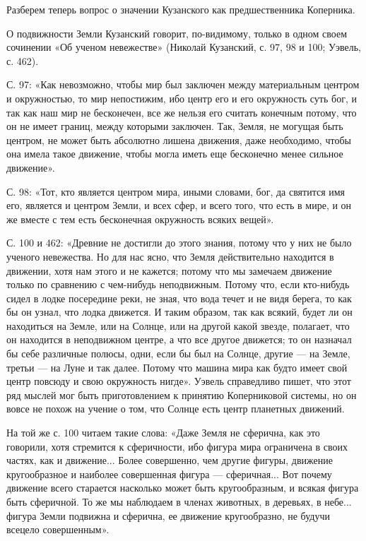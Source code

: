 Разберем  теперь  вопрос  о значении  Кузанского  как  предшественника
Коперника.

О  подвижности Земли  Кузанский говорит,  по-видимому, только  в одном
своем сочинении «Об ученом невежестве» (Николай Кузанский, с. 97, 98 и
100; Уэвель, с. 462).

С.  97: «Как  невозможно, чтобы  мир был  заключен между  материальным
центром  и  окружностью,  то  мир  непостижим, ибо  центр  его  и  его
окружность суть  бог, и так как  наш мир не бесконечен,  все же нельзя
его считать  конечным потому, что  он не имеет границ,  между которыми
заключен. Так, Земля, не могущая быть центром, не может быть абсолютно
лишена  движения, даже  необходимо,  чтобы она  имела такое  движение,
чтобы могла иметь еще бесконечно менее сильное движение».

С.  98:  «Тот, кто  является  центром  мира,  иными словами,  бог,  да
святится имя его, является и центром Земли, и всех сфер, и всего того,
что есть  в мире,  и он  же вместе с  тем есть  бесконечная окружность
всяких вещей».

С. 100 и 462:  «Древние не достигли до этого знания,  потому что у них
не было ученого  невежества. Но для нас ясно,  что Земля действительно
находится  в движении,  хотя нам  этого и  не кажется;  потому что  мы
замечаем движение только по сравнению с чем-нибудь неподвижным. Потому
что, если кто-нибудь сидел в лодке  посередине реки, не зная, что вода
течет и  не видя  берега, то как  бы он узнал,  что лодка  движется. И
таким образом, так как всякий, будет ли он находиться на Земле, или на
Солнце,  или на  другой какой  звезде,  полагает, что  он находится  в
неподвижном центре, а что все другое  движется; то он назначал бы себе
различные полюсы,  одни, если бы был  на Солнце, другие ---  на Земле,
третьи --- на Луне и так далее. Потому что машина мира как будто имеет
свой центр повсюду и свою окружность нигде». Уэвель справедливо пишет,
что этот  ряд мыслей мог  быть приготовлением к  принятию Коперниковой
системы, но он вовсе  не похож на учение о том,  что Солнце есть центр
планетных движений.

На той же с. 100 читаем такие  слова: «Даже Земля не сферична, как это
говорили,  хотя стремится  к сферичности,  ибо фигура  мира ограничена
в  своих  частях,  как  и движение...  Более  совершенно,  чем  другие
фигуры,  движение  кругообразное  и наиболее  совершенная  фигура  ---
сферичная... Вот почему движение  всего старается насколько может быть
кругообразным, и  всякая фигура быть  сферичной. То же мы  наблюдаем в
членах  животных,  в  деревьях,  в небе...  фигура  Земли  подвижна  и
сферична, ее движение кругообразно, не будучи всецело совершенным».

